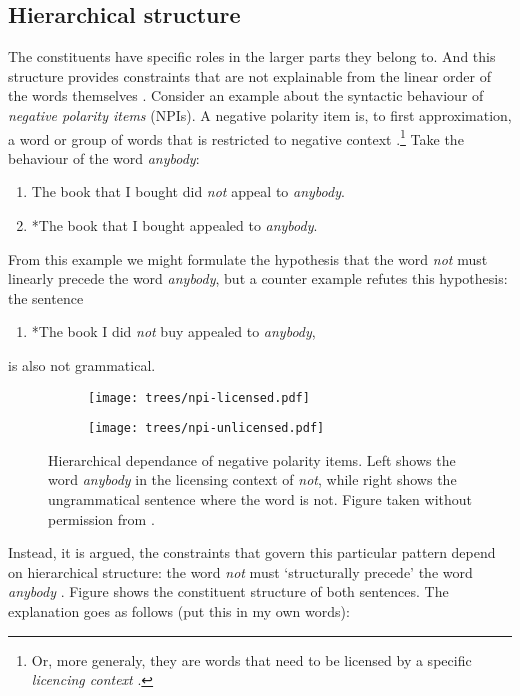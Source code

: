 \subsection{Hierarchical structure} The constituents have specific roles in the larger parts they belong to. And this structure provides constraints that are not explainable from the linear order of the words themselves \citep{everaert2015structures}. Consider an example about the syntactic behaviour of \textit{negative polarity items} (NPIs). A negative polarity item is, to first approximation, a word or group of words that is restricted to negative context \citep{everaert2015structures}.\footnote{Or, more generaly, they are words that need to be licensed by a specific \textit{licencing context} \citep{giannakidou2011npi}.} Take the behaviour of the word \textit{anybody}:
\begin{enumerate}[noitemsep]
  \item The book that I bought did \textit{not} appeal to \textit{anybody}.
  \item *The book that I bought appealed to \textit{anybody}.
\end{enumerate}
From this example we might formulate the hypothesis that the word \textit{not} must linearly precede the word \textit{anybody}, but a counter example refutes this hypothesis: the sentence
\begin{enumerate}
  \item *The book I did \textit{not} buy appealed to \textit{anybody},
\end{enumerate}
is also not grammatical.

\begin{figure}[h]
  \begin{subfigure}[b]{0.5\textwidth}
		\texttt{[image: trees/npi-licensed.pdf]}
	\end{subfigure}
	\begin{subfigure}[b]{0.5\textwidth}
		\texttt{[image: trees/npi-unlicensed.pdf]}
	\end{subfigure}
\caption{Hierarchical dependance of negative polarity items. Left shows the word \textit{anybody} in the licensing context of \textit{not}, while right shows the ungrammatical sentence where the word is not. Figure taken without permission from \cite{everaert2015structures}.}
\label{fig:trees-npi}
\end{figure}

Instead, it is argued, the constraints that govern this particular pattern depend on hierarchical structure: the word \textit{not} must `structurally precede' the word \textit{anybody} \citep{everaert2015structures}. Figure \label{ref:trees-npi} shows the constituent structure of both sentences. The explanation goes as follows (put this in my own words): 


